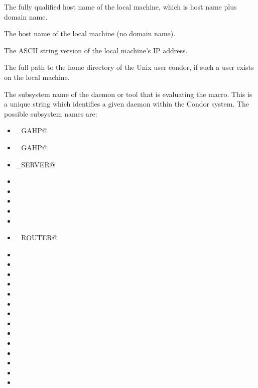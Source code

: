 \begin{description}
  
\label{param:FullHostname}
\item[\MacroU{FULL\_HOSTNAME}]
  The fully qualified host name of the local machine, 
  which is host name plus domain name.
  
\label{param:Hostname}
\item[\MacroU{HOSTNAME}]
  The host name of the local machine (no domain name).
  
\label{param:IpAddress}
\item[\MacroU{IP\_ADDRESS}]
  The ASCII string version of the local machine's IP address.

\label{param:Tilde}
\item[\MacroU{TILDE}]
  The full path to the
  home directory of the Unix user condor, if such a user exists on the
  local machine.

  \label{sec:Condor-Subsystem-Names}
\label{param:Subsystem}
\item[\MacroU{SUBSYSTEM}]
  The subsystem
  name of the daemon or tool that is evaluating the macro.
  This is a unique string which identifies a given daemon within the
  Condor system.  The possible subsystem names are:

  \begin{itemize}
  \label{list:subsystem names}
  \item \verb@AMAZON_GAHP@
  \item \verb@C_GAHP@
  \item \verb@CKPT_SERVER@
  \item \verb@COLLECTOR@
  \item \verb@DBMSD@
  \item \verb@GRIDMANAGER@
  \item \verb@HAD@
  \item \verb@HDFS@
  \item \verb@JOB_ROUTER@
  \item \verb@KBDD@ 
  \item \verb@LEASEMANAGER@
  \item \verb@MASTER@
  \item \verb@NEGOTIATOR@
  \item \verb@QUILL@
  \item \verb@REPLICATION@
  \item \verb@ROOSTER@
  \item \verb@SCHEDD@
  \item \verb@SHADOW@
  \item \verb@STARTD@
  \item \verb@STARTER@
  \item \verb@SUBMIT@
  \item \verb@TOOL@
  \item \verb@TRANSFERER@
  \end{itemize}

\end{description}

